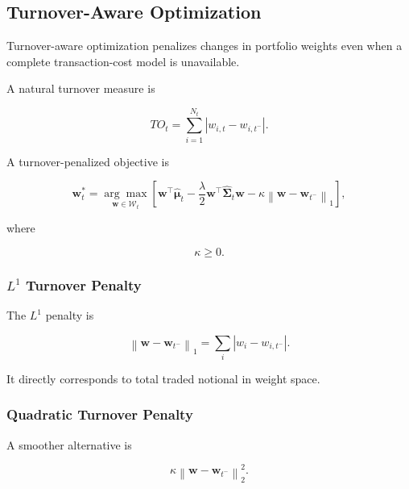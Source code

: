 \documentclass[11pt,a4paper]{article}
\begin{document}
\subsection{Turnover-Aware Optimization}
\label{subsec:turnover_aware_optimization}

Turnover-aware optimization penalizes changes in portfolio weights even when a
complete transaction-cost model is unavailable.

A natural turnover measure is

\begin{equation}
\boxed{
TO_t
=
\sum_{i=1}^{N_t}
\left|
w_{i,t}
-
w_{i,t^-}
\right|.
}
\end{equation}

A turnover-penalized objective is

\begin{equation}
\boxed{
\mathbf{w}_t^{*}
=
\underset{\mathbf{w}\in\mathcal{W}_t}{\arg\max}
\left[
\mathbf{w}^{\top}
\widehat{\boldsymbol{\mu}}_t
-
\frac{\lambda}{2}
\mathbf{w}^{\top}
\widehat{\boldsymbol{\Sigma}}_t
\mathbf{w}
-
\kappa
\left\|
\mathbf{w}
-
\mathbf{w}_{t^-}
\right\|_1
\right],
}
\end{equation}

where

\begin{equation}
\kappa\geq0.
\end{equation}


\subsubsection{$L^1$ Turnover Penalty}

The $L^1$ penalty is

\begin{equation}
\left\|
\mathbf{w}
-
\mathbf{w}_{t^-}
\right\|_1
=
\sum_i
|w_i-w_{i,t^-}|.
\end{equation}

It directly corresponds to total traded notional in weight space.


\subsubsection{Quadratic Turnover Penalty}

A smoother alternative is

\begin{equation}
\boxed{
\kappa
\left\|
\mathbf{w}
-
\mathbf{w}_{t^-}
\right\|_2^2.
}
\end{equation}
\end{document}
